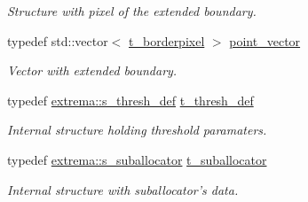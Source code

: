 \begin{CompactItemize}
\begin{CompactList}\small\item\em Structure with pixel of the extended boundary. \item\end{CompactList}\item 
typedef std::vector$<$ \hyperlink{structextrema_1_1s__borderpixel}{t\_\-borderpixel} $>$ \hyperlink{namespaceextrema_b08df8a480b75ca2cc69c83e902d5a8e}{point\_\-vector}
\begin{CompactList}\small\item\em Vector with extended boundary. \item\end{CompactList}\item 
typedef \hyperlink{structextrema_1_1s__thresh__def}{extrema::s\_\-thresh\_\-def} \hyperlink{namespaceextrema_b3ce6de2e321e3b4f1f4fe1fa89911ce}{t\_\-thresh\_\-def}
\begin{CompactList}\small\item\em Internal structure holding threshold paramaters. \item\end{CompactList}\item 
typedef \hyperlink{structextrema_1_1s__suballocator}{extrema::s\_\-suballocator} \hyperlink{namespaceextrema_6be19e858e73efb5002c6ee94bba43fb}{t\_\-suballocator}
\begin{CompactList}\small\item\em Internal structure with suballocator's data. \item\end{CompactList}\end{CompactItemize}
